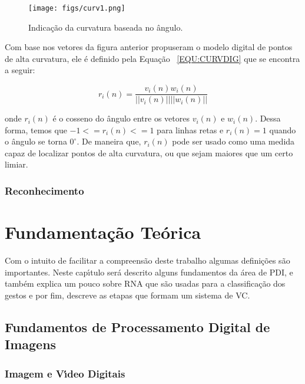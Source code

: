 \begin{figure}[h]
\centering
\texttt{[image: figs/curv1.png]}
\caption{Indica\c{c}\~{a}o da curvatura baseada no \^{a}ngulo.} \label{FIG:CURV1}
\end{figure}

Com base nos vetores da figura anterior \citet{JOHNSTON:1973} propuseram o modelo digital de pontos de alta curvatura, ele \'{e} 
definido pela Equa\c{c}\~{a}o ~\ref{EQU:CURVDIG} que se encontra a seguir:

\begin{equation}
r_{i}(n) = \frac{v_{i}(n)w_{i}(n)}{||v_{i}(n)||||w_{i}(n)||}
\label{EQU:CURVDIG}
\end{equation}

onde $r_i(n)$ \'{e} o cosseno do \^{a}ngulo entre os vetores $v_i(n)$ e $w_i(n)$. Dessa forma, temos que $-1 <= r_i(n) <= 1$ para linhas 
retas e $r_i(n) = 1$ quando o \^{a}ngulo se torna $0^\circ$. De maneira que, $r_i(n)$ pode ser usado como uma medida capaz de 
localizar pontos de alta curvatura, ou que sejam maiores que um certo limiar.


\subsection{Reconhecimento}





\chapter{Fundamenta\c{c}\~{a}o Te\'{o}rica} \label{CHP:REVI}%

Com o intuito de facilitar a compreens\~{a}o deste trabalho algumas defini\c{c}\~{o}es s\~{a}o importantes. Neste cap\'{\i}tulo ser\'{a} descrito alguns fundamentos da \'{a}rea de \ac{PDI}, e tamb\'{e}m explica um pouco sobre \ac{RNA} que s\~{a}o usadas para a classifica\c{c}\~{a}o dos gestos e por fim, descreve as etapas que formam um sistema de \ac{VC}.

\section{Fundamentos de Processamento Digital de Imagens}

\subsection{Imagem e V\'{\i}deo Digitais}

